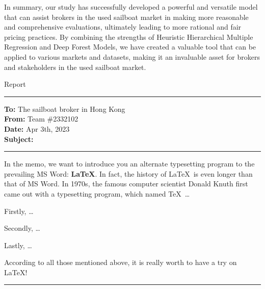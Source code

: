 \documentclass[12pt]{article}  %
\begin{document}
In summary, our study has successfully developed a powerful and versatile model that can assist brokers in the used sailboat market in making more reasonable and comprehensive evaluations, ultimately leading to more rational and fair pricing practices. By combining the strengths of Heuristic Hierarchical Multiple Regression and Deep Forest Models, we have created a valuable tool that can be applied to various markets and datasets, making it an invaluable asset for brokers and stakeholders in the used sailboat market.
\begin{letter}{Report}
\noindent\rule[0.25\baselineskip]{\textwidth}{2pt} 
\begin{flushleft}  %
\textbf{To:} The sailboat broker in Hong Kong\\
\textbf{From:} Team \#2332102\\
\textbf{Date:} Apr 3th, 2023\\
\textbf{Subject:} 
\noindent\rule[0.25\baselineskip]{\textwidth}{1pt}
\end{flushleft}

In the memo, we want to introduce you an alternate typesetting program to the prevailing MS Word: \textbf{\LaTeX}. In fact, the history of \LaTeX\ is even longer than that of MS Word. In 1970s, the famous computer scientist Donald Knuth first came out with a typesetting program, which named \TeX\ \ldots

Firstly, \ldots

Secondly, \ldots

Lastly, \ldots

According to all those mentioned above, it is really worth to have a try on \LaTeX! 

\noindent\rule[0.25\baselineskip]{\textwidth}{2pt} 
\end{letter}
\clearpage
\end{document}
